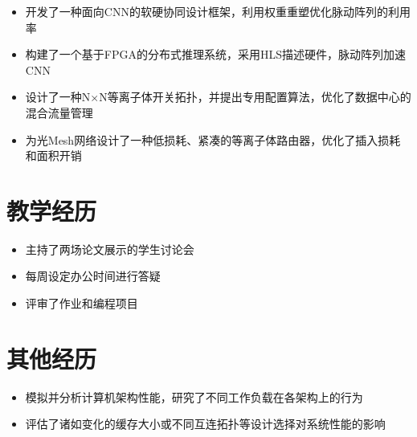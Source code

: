 \documentclass{resume}
\begin{document}
\vspace{-8pt}
\begin{itemize}
  \item 开发了一种面向CNN的软硬协同设计框架，利用权重重塑优化脉动阵列的利用率
  \item 构建了一个基于FPGA的分布式推理系统，采用HLS描述硬件，脉动阵列加速CNN
  \item 设计了一种N$\times$N等离子体开关拓扑，并提出专用配置算法，优化了数据中心的混合流量管理
  \item 为光Mesh网络设计了一种低损耗、紧凑的等离子体路由器，优化了插入损耗和面积开销
\end{itemize}

\section{教学经历}
\vspace{-8pt}
\begin{itemize}
  \item 主持了两场论文展示的学生讨论会
  \item 每周设定办公时间进行答疑
  \item 评审了作业和编程项目
\end{itemize}


\section{其他经历}
\vspace{-8pt}
\begin{itemize}
  \item 模拟并分析计算机架构性能，研究了不同工作负载在各架构上的行为
  \item 评估了诸如变化的缓存大小或不同互连拓扑等设计选择对系统性能的影响
\end{itemize}
\end{document}
